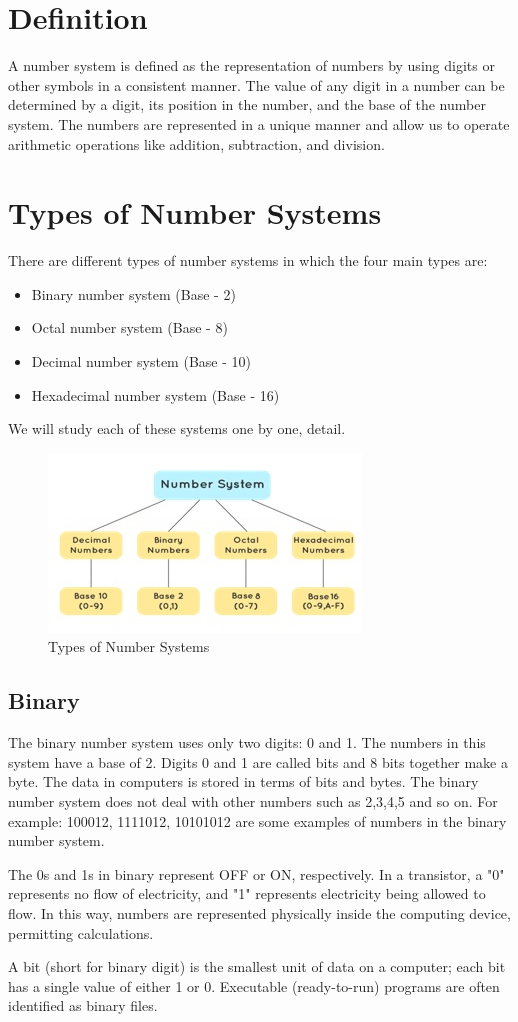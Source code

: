 \documentclass[11pt,a4paper,twoside]{article}
\begin{document}
\section{Definition}
A number system is defined as the representation of numbers by using digits or other symbols in a consistent manner. The value of any digit in a number can be determined by a digit, its position in the number, and the base of the number system. The numbers are represented in a unique manner and allow us to operate arithmetic operations like addition, subtraction, and division.
\section{Types of Number Systems}
There are different types of number systems in which the four main types are:
\begin{itemize}
    \item Binary number system (Base - 2)
\item Octal number system (Base - 8)
\item Decimal number system (Base - 10)
\item Hexadecimal number system (Base - 16)
\end{itemize}
We will study each of these systems one by one, detail.
\begin{figure}[H]
\centering \includegraphics[scale=1]{Fig 22.jpg}
\caption{Types of Number Systems}
\end{figure}
\subsection{Binary}
The binary number system uses only two digits: 0 and 1. The numbers in this system have a base of 2. Digits 0 and 1 are called bits and 8 bits together make a byte. The data in computers is stored in terms of bits and bytes. The binary number system does not deal with other numbers such as 2,3,4,5 and so on. For example: 100012, 1111012, 10101012 are some examples of numbers in the binary number system.\par
The 0s and 1s in binary represent OFF or ON, respectively. In a transistor, a "0" represents no flow of electricity, and "1" represents electricity being allowed to flow. In this way, numbers are represented physically inside the computing device, permitting calculations.\par
A bit (short for binary digit) is the smallest unit of data on a computer; each bit has a single value of either 1 or 0. Executable (ready-to-run) programs are often identified as binary files.
\end{document}
